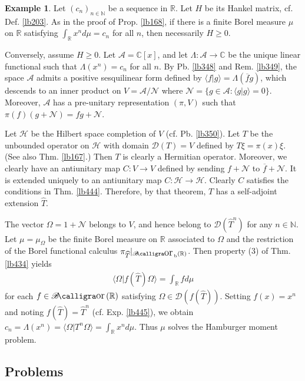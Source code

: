 \documentclass[12pt,b5paper,notitlepage]{article}
\theoremstyle{definition}
\newtheorem{eg}[df]{Example}
\theoremstyle{plain}
\DeclareMathOperator{\Bor}{\mathscr{B}\text{\kern -2pt {\calligra\large or}}\,}
\DeclareMathOperator{\Borb}{{\mathscr{B}\text{\kern -2pt {\calligra\large or}}\,}_{\mathrm b}}
\newcommand{\wht}{\widehat}
\newcommand{\ovl}{\overline}
\newcommand{\Dom}{\mathscr{D}}
\newcommand{\bk}[1]{\langle {#1}\rangle}
\newcommand{\scr}{\mathscr}
\newcommand{\Cbb}{\mathbb C}
\newcommand{\Nbb}{\mathbb N}
\newcommand{\Rbb}{\mathbb R}
\newcommand{\MH}{\mathcal H}
\newcommand{\SA}{\mathscr A}
\newcommand{\hqed}{\hfill\qedsymbol}
\numberwithin{equation}{section}
\begin{document}
\begin{eg}\label{lb478}
Let $(c_n)_{n\in\Nbb}$ be a sequence in $\Rbb$. Let $H$ be its Hankel matrix, cf. Def. \ref{lb203}. As in the proof of Prop. \ref{lb168}, if there is a finite Borel measure $\mu$ on $\Rbb$ satisfying $\int_\Rbb x^nd\mu=c_n$ for all $n$, then necessarily $H\geq0$.


Conversely, assume $H\geq0$. Let $\SA=\Cbb[x]$, and let $\Lambda:\SA\rightarrow\Cbb$ be the unique linear functional such that $\Lambda(x^n)=c_n$ for all $n$. By Pb. \ref{lb348} and Rem. \ref{lb349}, the space $\SA$ admits a positive sesquilinear form defined by $\bk{f|g}=\Lambda(\ovl fg)$, which descends to an inner product on $V=\SA/\scr N$ where $\scr N=\{g\in\SA:\bk{g|g}=0\}$. Moreover, $\SA$ has a pre-unitary representation $(\pi,V)$ such that $\pi(f)(g+\scr N)=fg+\scr N$. 

Let $\MH$ be the Hilbert space completion of $V$ (cf. Pb. \ref{lb350}). Let $T$ be the unbounded operator on $\MH$ with domain $\Dom(T)=V$ defined by $T\xi=\pi(x)\xi$. (See also Thm. \ref{lb167}.) Then $T$ is clearly a Hermitian operator. Moreover, we clearly have an antiunitary map $C:V\rightarrow V$ defined by sending $f+\scr N$ to $\ovl f+\scr N$. It is extended uniquely to an antiunitary map $C:\MH\rightarrow\MH$. Clearly $C$ satisfies the conditions in Thm. \ref{lb444}. Therefore, by that theorem, $T$ has a self-adjoint extension $\wht T$.

The vector $\Omega=1+\scr N$ belongs to $V$, and hence belong to $\Dom(\wht T^n)$ for any $n\in\Nbb$. Let $\mu=\mu_\Omega$ be the finite Borel measure on $\Rbb$ associated to $\Omega$ and the restriction of the Borel functional calculus $\pi_{\wht T}|_{\Borb(\Rbb)}$. Then property (3) of Thm. \ref{lb434} yields
\begin{align*}
\bk{\Omega|f(\wht T)\Omega}=\int_\Rbb fd\mu
\end{align*}
for each $f\in\Bor(\Rbb)$ satisfying $\Omega\in\Dom(f(\wht T))$. Setting $f(x)=x^n$ and noting $f(\wht T)=\wht T^n$ (cf. Exp. \ref{lb445}), we obtain $c_n=\Lambda(x^n)=\bk{\Omega|T^n\Omega}=\int_\Rbb x^nd\mu$. Thus $\mu$ solves the Hamburger moment problem.  \hqed 
\end{eg}






\subsection{Problems}
\end{document}
